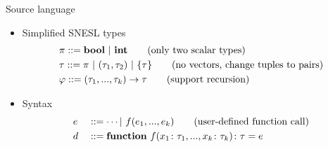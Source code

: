 \documentclass{beamer}
\begin{document}
\begin{frame}{Source language}

\begin{itemize}
\item Simplified SNESL types
	{\small\begin{align*} 
	& \pi ::= \mathbf{bool} \ | \ \mathbf{int}  \tag{only two scalar types}\\ 
	& \tau ::= \pi \ | \ (\tau_1,\tau_2) \ | \ \{\tau\} \tag{no vectors, change tuples to pairs} \\
	& \varphi :: = (\tau_1,...,\tau_k) \rightarrow \tau  \tag{support recursion}
	\end{align*}}	
\pause
\item Syntax
	{\small \begin{alignat*}{2} 
	& e &&::= \cdots | \ f (e_1,...,e_k)  \tag {user-defined function call} \\
	& d &&::= \mathbf{function} \  f (x_1\colon{\tau_1}, ..., x_k\colon\tau_k)\colon{\tau} = e \\
	\end{alignat*}
   }
\end{itemize}
\end{frame}
\end{document}
